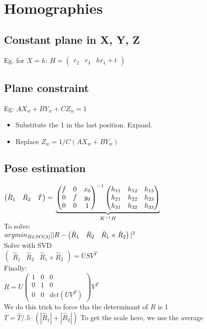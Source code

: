 \section{Homographies}
\subsection*{Constant plane in X, Y, Z}
Eg. for $X = h$:  $H = \begin{pmatrix}
  r_2 & r_3 & h r_1 + t
\end{pmatrix}$

\subsection*{Plane constraint}
Eg: $A X_w + B Y_w + C Z_w = 1$
\begin{itemize}
  \item Substitute the 1 in the last position. Expand.
  \item Replace $Z_w = 1/C (A X_w + B Y_w)$
\end{itemize}

\subsection*{Pose estimation}
$\begin{pmatrix} \hat{R}_1 & \hat{R}_2 & \hat{T}\end{pmatrix}
=\\
\underbrace{
\begin{pmatrix}
  f & 0 & x_0 \\ 0 & f &y_0\\0 & 0 & 1
\end{pmatrix}^{-1}
\begin{pmatrix}
  h_{11} & h_{12} & h_{13} \\
  h_{21} & h_{22} & h_{23} \\
  h_{31} & h_{32} & h_{33}
\end{pmatrix}
}_{K^{-1} H}
$\\
To solve:\\
$argmin_{R\in SO(3)}\\
||R -
\begin{pmatrix}
  \hat{R}_1 & \hat{R}_2 & \hat{R}_1 \times \hat{R}_2
\end{pmatrix}|^2$\\
Solve with SVD\\
$\begin{pmatrix}
  \hat{R}_1 & \hat{R}_2 & \hat{R}_1 \times \hat{R}_2
\end{pmatrix} = U S V^T$\\
Finally:\\
$R = U
\begin{pmatrix}
  1 & 0 & 0\\
  0 & 1 & 0\\
  0 & 0 & det(U V^T)
\end{pmatrix} V^T$ \\
\alert{We do this trick to force tha the determinant of $R$ is 1}\\
$T = \hat{T}/.5\cdot(|\hat{R}_1|+|\hat{R}_2|)$
\alert{To get the scale here, we use the average}
